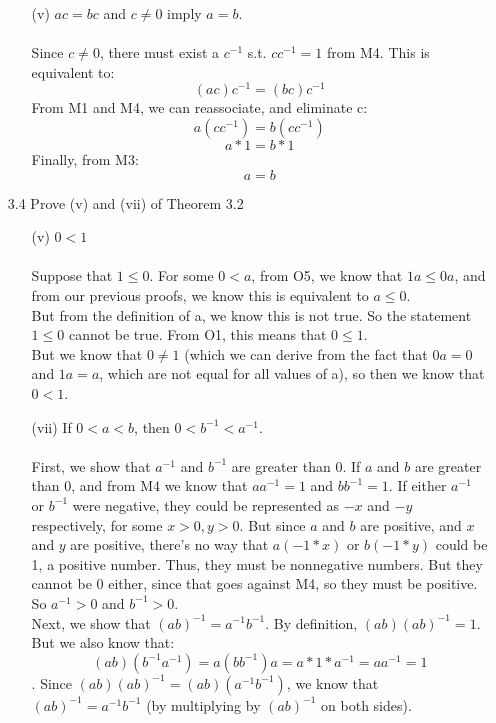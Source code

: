 \begin{itemize}
\begin{itemize}
      \item [(v)] $ac = bc$ and $c \neq 0$ imply $a = b$.\\\\
        Since $c \neq 0$, there must exist a $c^{-1}$ s.t. $cc^{-1} = 1$ from M4.
        This is equivalent to:
        $$(ac)c^{-1} = (bc)c^{-1}$$
        From M1 and M4, we can reassociate, and eliminate c:
        $$a(cc^{-1}) = b(cc^{-1})$$
        $$a*1 = b*1$$
        Finally, from M3:
        $$a = b$$
    \end{itemize}
  \item[3.4]
    Prove (v) and (vii) of Theorem 3.2
    \begin{itemize}
      \item [(v)] $0 < 1$\\\\

        Suppose that $1 \leq 0$. For some $0 < a$, from O5, we know that $1a \leq 0a$, and from our previous proofs, we know this is equivalent to $a \leq 0$. \\
        But from the definition of a, we know this is not true. So the statement $1 \leq 0$ cannot be true. From O1, this means that $0 \leq 1$.\\
        But we know that $0 \neq 1$ (which we can derive from the fact that $0a = 0$ and $1a = a$, which are not equal for all values of a), so then we know that $0 < 1$.
      \item [(vii)] If $0 < a < b$, then $0 < b^{-1} < a^{-1}$.\\\\

        First, we show that $a^{-1}$ and $b^{-1}$ are greater than 0. If $a$ and $b$ are greater than 0, and from M4 we know that $aa^{-1} = 1$ and $bb^{-1} = 1$. If either $a^{-1}$ or $b^{-1}$ were negative, they could be represented as $-x$ and $-y$ respectively, for some $x > 0, y > 0$. But since $a$ and $b$ are positive, and $x$ and $y$ are positive, there's no way that $a(-1*x)$ or $b(-1*y)$ could be 1, a positive number. Thus, they must be nonnegative numbers. But they cannot be 0 either, since that goes against M4, so they must be positive. So $a^{-1} > 0$ and $b^{-1} > 0$.\\

        Next, we show that $(ab)^{-1} = a^{-1}b^{-1}$. By definition, $(ab)(ab)^{-1} = 1$. But we also know that:
        $$(ab)(b^{-1}a^{-1}) = a(bb^{-1})a = a*1*a^{-1} = aa^{-1} = 1$$. Since $(ab)(ab)^{-1} = (ab)(a^{-1}b^{-1})$, we know that $(ab)^{-1} = a^{-1}b^{-1}$ (by multiplying by $(ab)^{-1}$ on both sides).


\end{itemize}
\end{itemize}
